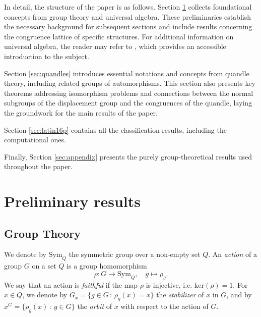 \documentclass[a4paper, english, 9pt]{amsart}
\theoremstyle{plain}
\theoremstyle{definition}
\def\ker#1{\mathrm{ker}(#1)}
\def\Sym{\mathrm{Sym}}
\begin{document}
In detail, the structure of the paper is as follows. Section \ref{sec:preliminary} collects foundational concepts from group theory and universal algebra. These preliminaries establish the necessary background for subsequent sections and include results concerning the congruence lattice of specific structures. For additional information on universal algebra, the reader may refer to \cite{bergman2011universal}, which provides an accessible introduction to the subject.

Section \ref{sec:quandles} introduces essential notations and concepts from quandle theory, including related groups of automorphisms. This section also presents key theorems addressing isomorphism problems and connections between the normal subgroups of the displacement group and the congruences of the quandle, laying the groundwork for the main results of the paper.

Section \ref{sec:latin16p} contains all the classification results, including the computational ones.

Finally, Section \ref{sec:appendix} presents the purely group-theoretical results used throughout the paper. %



\section{Preliminary results} \label{sec:preliminary}
\subsection{Group Theory}


We denote by $\Sym_Q$ the symmetric group over a non-empty set $Q$. An \emph{action} of a group $G$ on a set $Q$ is a group homomorphism $$\rho:G\longrightarrow \Sym_Q,\quad g\mapsto \rho_g.$$ We say that an action is \emph{faithful} if the map $\rho$ is injective, i.e. $\ker{\rho}=1$. For $x\in Q$, we denote by $G_x=\{g\in G\,\colon\, \rho_g(x)=x\}$ the \emph{stabilizer} of $x$ in $G$, and by $x^G=\{\rho_g(x)\,\colon\ g\in G\}$ the \emph{orbit} of $x$ with respect to the action of $G$.
\end{document}
